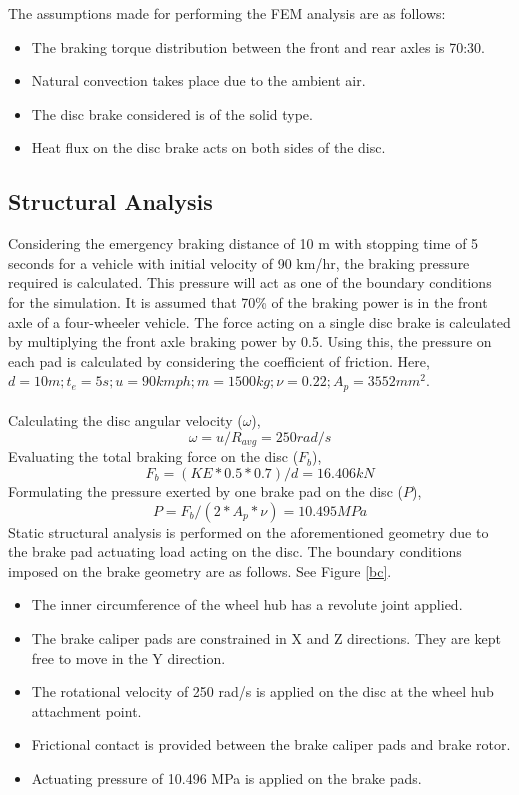 \documentclass[12pt]{article}
\begin{document}
The assumptions made for performing the FEM analysis are as follows:
\begin{itemize}
\item The braking torque distribution between the front and rear axles is 70:30.
\item Natural convection takes place due to the ambient air.
\item The disc brake considered is of the solid type.
\item Heat flux on the disc brake acts on both sides of the disc.
\end{itemize}

\subsection{Structural Analysis}
Considering the emergency braking distance of 10 m with stopping time of 5 seconds for a vehicle with initial velocity of 90 km/hr, the braking pressure required is calculated. This pressure will act as one of the boundary conditions for the simulation. It is assumed that 70\% of the braking power is in the front axle of a four-wheeler vehicle. The force acting on a single disc brake is calculated by multiplying the front axle braking power by 0.5. Using this, the pressure on each pad is calculated by considering the coefficient of friction. Here, $d = 10 m; t_{e} = 5 s; u = 90 kmph; m = 1500 kg; \nu = 0.22; A_{p} = 3552 mm^{2}$.\\\\
Calculating the disc angular velocity ($\omega$),
\begin{equation}
\omega = u/R_{avg} = 250 rad/s
\end{equation}
Evaluating the total braking force on the disc ($F_{b}$),
\begin{equation}
F_{b} = (KE*0.5*0.7)/d = 16.406 kN
\end{equation}
Formulating the pressure exerted by one brake pad on the disc ($P$),
\begin{equation}
P = F_{b}/(2*A_{p}*\nu) = 10.495 MPa
\end{equation}
Static structural analysis is performed on the aforementioned geometry due to the brake pad actuating load acting on the disc. The boundary conditions imposed on the brake geometry are as follows. See Figure \ref{bc}.
\begin{itemize}
\item The inner circumference of the wheel hub has a revolute joint applied.
\item The brake caliper pads are constrained in X and Z directions. They are kept free to move in the Y direction.
\item The rotational velocity of 250 rad/s is applied on the disc at the wheel hub attachment point.
\item Frictional contact is provided between the brake caliper pads and brake rotor.
\item Actuating pressure of 10.496 MPa is applied on the brake pads.
\end{itemize}
\end{document}
